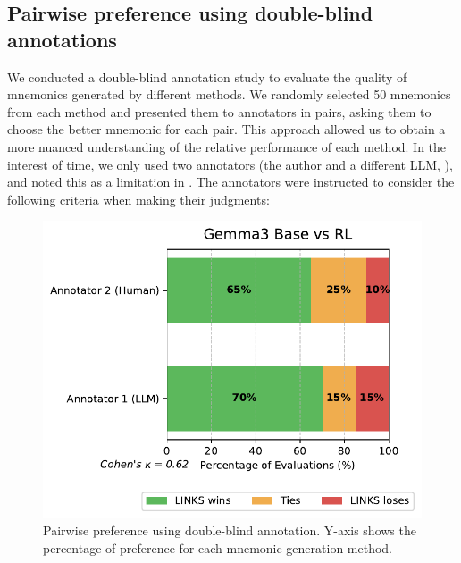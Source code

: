 \subsection{Pairwise preference using double-blind annotations} \label{sec:pairwise-preference}
We conducted a double-blind annotation study to evaluate the quality of mnemonics generated by different methods. We randomly selected 50 mnemonics from each method and presented them to annotators in pairs, asking them to choose the better mnemonic for each pair. This approach allowed us to obtain a more nuanced understanding of the relative performance of each method. In the interest of time, we only used two annotators (the author and a different LLM, \judgemodel), and noted this as a limitation in . The annotators were instructed to consider the following criteria when making their judgments:

\begin{figure}[htb]
  \centering
  \includegraphics[width=\linewidth]{figures/model_comparison.pdf}
  \caption{Pairwise preference using double-blind annotation. Y-axis shows the percentage of preference for each mnemonic generation method.}
\end{figure}
